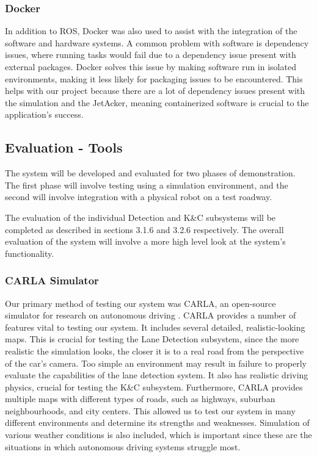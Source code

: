 \documentclass[titlepage, draft]{article}
\begin{document}
{\subsubsection{Docker}
In addition to ROS, Docker was also used to assist with the integration of the software and hardware systems. A common problem with software is dependency issues, where running tasks would fail due to a dependency issue present with external packages. Docker solves this issue by making software run in isolated environments, making it less likely for packaging issues to be encountered. This helps with our project because there are a lot of dependency issues present with the simulation and the JetAcker, meaning containerized software is crucial to the application's success.


\subsection{Evaluation - Tools}
The system will be developed and evaluated for two phases of demonstration. The first phase will involve testing using a simulation environment, and the second will involve integration with a physical robot on a test roadway.

The evaluation of the individual Detection and K\&C subsystems will be completed as described in sections 3.1.6 and 3.2.6 respectively. The overall evaluation of the system will involve a more high level look at the system’s functionality.

\subsubsection{CARLA Simulator}
Our primary method of testing our system was CARLA, an open-source simulator for research on autonomous driving \cite{dosovitskiy2017carla}. CARLA provides a number of features vital to testing our system. It includes several detailed, realistic-looking maps. This is crucial for testing the Lane Detection subsystem, since the more realistic the simulation looks, the closer it is to a real road from the perspective of the car's camera. Too simple an environment may result in failure to properly evaluate the capabilities of the lane detection system. It also has realistic driving physics, crucial for testing the K\&C subsystem. Furthermore, CARLA provides multiple maps with different types of roads, such as highways, suburban neighbourhoods, and city centers. This allowed us to test our system in many different environments and determine its strengths and weaknesses. Simulation of various weather conditions is also included, which is important since these are the situations in which autonomous driving systems struggle most.

}
\end{document}
